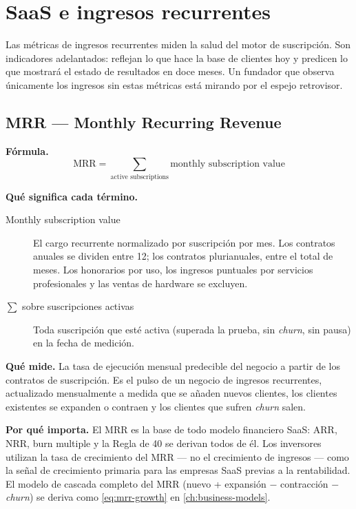 \section{SaaS e ingresos recurrentes}

Las métricas de ingresos recurrentes miden la salud del motor de suscripción. Son
indicadores adelantados: reflejan lo que hace la base de clientes hoy y predicen lo que
mostrará el estado de resultados en doce meses. Un fundador que observa únicamente los
ingresos sin estas métricas está mirando por el espejo retrovisor.

\subsection{MRR --- Monthly Recurring Revenue}

\textbf{Fórmula.}
\[
  \mathrm{MRR} = \sum_{\text{active subscriptions}} \text{monthly subscription value}
\]

\textbf{Qué significa cada término.}
\begin{description}
  \item[Monthly subscription value] El cargo recurrente normalizado por suscripción por mes.
    Los contratos anuales se dividen entre 12; los contratos plurianuales, entre el total de
    meses. Los honorarios por uso, los ingresos puntuales por servicios profesionales y las
    ventas de hardware se excluyen.
  \item[$\sum$ sobre suscripciones activas] Toda suscripción que esté activa (superada la
    prueba, sin \emph{churn}, sin pausa) en la fecha de medición.
\end{description}

\textbf{Qué mide.} La tasa de ejecución mensual predecible del negocio a partir de los
contratos de suscripción. Es el pulso de un negocio de ingresos recurrentes, actualizado
mensualmente a medida que se añaden nuevos clientes, los clientes existentes se expanden o
contraen y los clientes que sufren \emph{churn} salen.

\textbf{Por qué importa.} El MRR es la base de todo modelo financiero SaaS: ARR, NRR, burn
multiple y la Regla de 40 se derivan todos de él. Los inversores utilizan la tasa de
crecimiento del MRR --- no el crecimiento de ingresos --- como la señal de crecimiento
primaria para las empresas SaaS previas a la rentabilidad. El modelo de cascada completo del
MRR (nuevo + expansión $-$ contracción $-$ \emph{churn}) se deriva como \cref{eq:mrr-growth}
en \cref{ch:business-models}.

